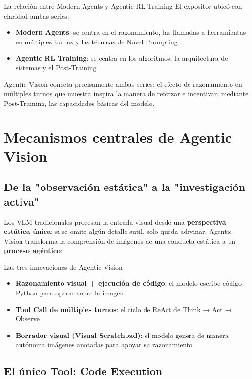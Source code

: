 \documentclass[a4paper]{article}
\begin{document}
\begin{knowledgebox}{La relación entre Modern Agents y Agentic RL Training}
El expositor ubicó con claridad ambas series:
\begin{itemize}
    \item \textbf{Modern Agents}: se centra en el razonamiento, las llamadas a herramientas en múltiples turnos y las técnicas de Novel Prompting
    \item \textbf{Agentic RL Training}: se centra en los algoritmos, la arquitectura de sistemas y el Post-Training
\end{itemize}
Agentic Vision conecta precisamente ambas series: el efecto de razonamiento en múltiples turnos que muestra inspira la manera de reforzar e incentivar, mediante Post-Training, las capacidades básicas del modelo.
\end{knowledgebox}

\section{Mecanismos centrales de Agentic Vision}

\subsection{De la "observación estática" a la "investigación activa"}

Los VLM tradicionales procesan la entrada visual desde una \textbf{perspectiva estática única}: si se omite algún detalle sutil, solo queda adivinar. Agentic Vision transforma la comprensión de imágenes de una conducta estática a un \textbf{proceso agéntico}:

\begin{importantbox}{Las tres innovaciones de Agentic Vision}
\begin{itemize}
    \item \textbf{Razonamiento visual + ejecución de código}: el modelo escribe código Python para operar sobre la imagen
    \item \textbf{Tool Call de múltiples turnos}: el ciclo de ReAct de Think → Act → Observe
    \item \textbf{Borrador visual (Visual Scratchpad)}: el modelo genera de manera autónoma imágenes anotadas para apoyar su razonamiento
\end{itemize}
\end{importantbox}

\subsection{El único Tool: Code Execution}
\end{document}
